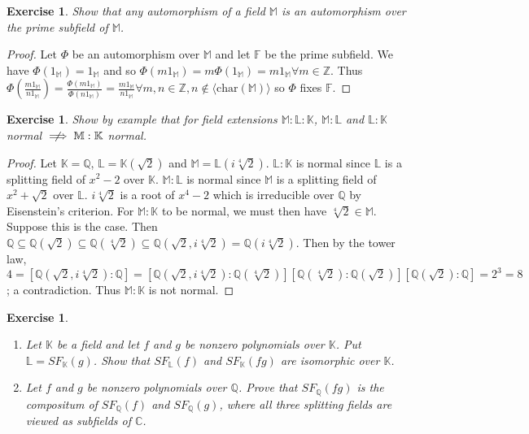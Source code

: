 \documentclass{article}
\newtheorem{exercise}[theorem]{Exercise}
\begin{document}
\begin{exercise}
Show that any automorphism of a field $\mathbb{M}$ is an automorphism  over the prime subfield of $\mathbb{M}$.
\end{exercise}
\begin{proof}
Let $\Phi$ be an automorphism over $\mathbb{M}$ and let $\mathbb{F}$ be the prime subfield. We have $\Phi(1_\mathbb{M})=1_\mathbb{M}$ and so $\Phi(m1_\mathbb{M})=m\Phi(1_\mathbb{M})=m1_\mathbb{M}\forall m\in\mathbb{Z}$. Thus $\Phi(\frac{m1_\mathbb{M}}{n1_\mathbb{M}})=\frac{\Phi(m1_\mathbb{M})}{\Phi(n1_\mathbb{M})}=\frac{m1_\mathbb{M}}{n1_\mathbb{M}}\forall m,n\in\mathbb{Z},n\not\in\langle\text{char}(\mathbb{M}) \rangle$ so $\Phi$ fixes $\mathbb{F}$.
\end{proof}

\begin{exercise}
Show by example that for field extensions $\mathbb{M}:\mathbb{L}:\mathbb{K}$, $\mathbb{M}:\mathbb{L}$ and $\mathbb{L}:\mathbb{K}$ normal $\centernot\implies\mathbb{M}:\mathbb{K}$ normal.
\end{exercise}
\begin{proof}
Let $\mathbb{K}=\mathbb{Q}$, $\mathbb{L}=\mathbb{K}(\sqrt{2})$ and $\mathbb{M}=\mathbb{L}(i\sqrt[4]{2})$. $\mathbb{L}:\mathbb{K}$ is normal since $\mathbb{L}$ is a splitting field of $x^2-2$ over $\mathbb{K}$. $\mathbb{M}:\mathbb{L}$ is normal since $\mathbb{M}$ is a splitting field of $x^2+\sqrt{2}$ over $\mathbb{L}$. $i\sqrt[4]{2}$ is a root of $x^4-2$ which is irreducible over $\mathbb{Q}$ by Eisenstein's criterion. For $\mathbb{M}:\mathbb{K}$ to be normal, we must then have $\sqrt[4]{2}\in\mathbb{M}$. Suppose this is the case. Then $\mathbb{Q}\subseteq\mathbb{Q}(\sqrt{2})\subseteq\mathbb{Q}(\sqrt[4]{2})\subseteq\mathbb{Q}(\sqrt{2},i\sqrt[4]{2})=\mathbb{Q}(i\sqrt[4]{2})$. Then by the tower law, $4=[\mathbb{Q}(\sqrt{2},i\sqrt[4]{2}):\mathbb{Q}]=[\mathbb{Q}(\sqrt{2},i\sqrt[4]{2}):\mathbb{Q}(\sqrt[4]{2})][\mathbb{Q}(\sqrt[4]{2}):\mathbb{Q}(\sqrt{2})][\mathbb{Q}(\sqrt{2}):\mathbb{Q}]=2^3=8$; a contradiction. Thus $\mathbb{M}:\mathbb{K}$ is not normal.
\end{proof}

\begin{exercise}
\begin{enumerate}[label=(\roman*)]
    \item Let $\mathbb{K}$ be a field and let $f$ and $g$ be nonzero polynomials over $\mathbb{K}$. Put $\mathbb{L}=SF_\mathbb{K}(g)$. Show that $SF_\mathbb{L}(f)$ and $SF_\mathbb{K}(fg)$ are isomorphic over $\mathbb{K}$.
    \item Let $f$ and $g$ be nonzero polynomials over $\mathbb{Q}$. Prove that $SF_\mathbb{Q}(fg)$ is the compositum of $SF_\mathbb{Q}(f)$ and $SF_\mathbb{Q}(g)$, where all three splitting fields are viewed as subfields of $\mathbb{C}$.
\end{enumerate}
\end{exercise}
\end{document}
